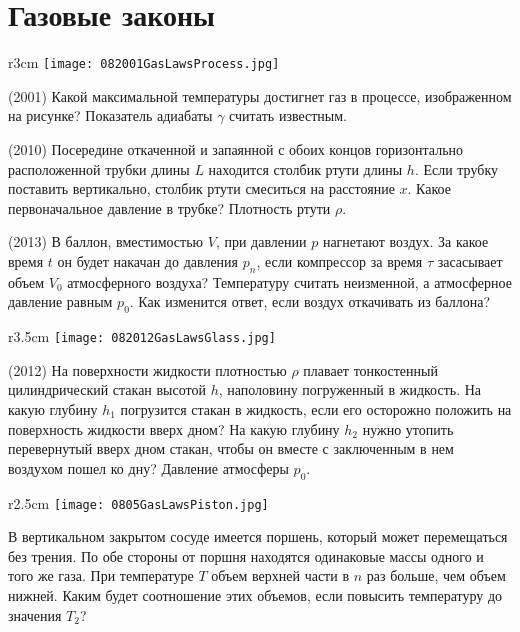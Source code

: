 \section{Газовые законы}

\begin{wrapfigure}{r}{3cm}
\texttt{[image: 082001GasLawsProcess.jpg]}
\end{wrapfigure}

\AddProb (2001) Какой максимальной температуры достигнет газ в процессе, изображенном на рисунке? Показатель адиабаты $\gamma$ считать известным.

\AddProb (2010) Посередине откаченной и запаянной с обоих концов горизонтально расположенной трубки длины $L$ находится столбик ртути длины $h$. 
Если трубку поставить вертикально, столбик ртути смеситься на расстояние $x$. Какое первоначальное давление в трубке? Плотность ртути $\rho$.

\AddProb (2013) В баллон, вместимостью $V$, при давлении $p$ нагнетают воздух. 
За какое время $t$ он будет накачан до давления $p_n$, если компрессор за время $\tau$ засасывает объем $V_0$ атмосферного воздуха? 
Температуру считать неизменной, а атмосферное давление равным $p_0$. Как изменится ответ, если воздух откачивать из баллона?

\begin{wrapfigure}{r}{3.5cm}
\texttt{[image: 082012GasLawsGlass.jpg]}
\end{wrapfigure}

\AddProb (2012) На поверхности жидкости плотностью $\rho$ плавает тонкостенный цилиндрический стакан высотой $h$, наполовину погруженный в жидкость. 
На какую глубину $h_1$ погрузится стакан в жидкость, если его осторожно положить на поверхность жидкости вверх дном? 
На какую глубину $h_2$ нужно утопить перевернутый вверх дном стакан, чтобы он вместе с заключенным в нем воздухом пошел ко дну? Давление атмосферы $p_0$.

\begin{wrapfigure}{r}{2.5cm}
\texttt{[image: 0805GasLawsPiston.jpg]}
\end{wrapfigure}

\AddProb В вертикальном закрытом сосуде имеется поршень, который может перемещаться без трения. 
По обе стороны от поршня находятся одинаковые массы одного и того же газа. 
При температуре $T$ объем верхней части в $n$ раз больше, чем объем нижней. 
Каким будет соотношение этих объемов, если повысить температуру до значения $T_2$?



